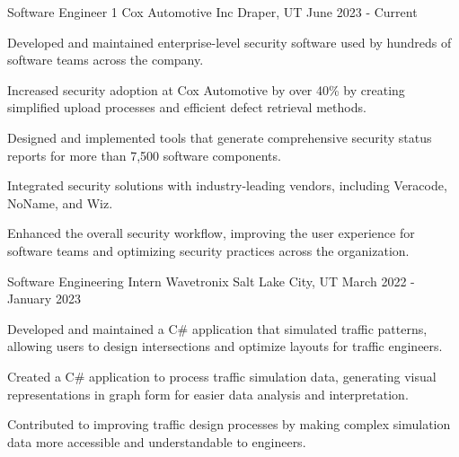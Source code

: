 


\begin{cventries}


\cventry
{Software Engineer 1} %
{Cox Automotive Inc} %
{Draper, UT} %
{June 2023 - Current} %
{ %
\begin{cvitems}
\item {Developed and maintained enterprise-level security software used by hundreds of software teams across the company.}
\item {Increased security adoption at Cox Automotive by over 40\% by creating simplified upload processes and efficient defect retrieval methods.}
\item {Designed and implemented tools that generate comprehensive security status reports for more than 7,500 software components.}
\item {Integrated security solutions with industry-leading vendors, including Veracode, NoName, and Wiz.}
\item {Enhanced the overall security workflow, improving the user experience for software teams and optimizing security practices across the organization.}
\end{cvitems}
}


\cventry
{Software Engineering Intern} %
{Wavetronix} %
{Salt Lake City, UT} %
{March 2022 - January 2023} %
{ %
\begin{cvitems}
\item {Developed and maintained a C\# application that simulated traffic patterns, allowing users to design intersections and optimize layouts for traffic engineers.}
\item {Created a C\# application to process traffic simulation data, generating visual representations in graph form for easier data analysis and interpretation.}
\item {Contributed to improving traffic design processes by making complex simulation data more accessible and understandable to engineers.}
\end{cvitems}
}


\end{cventries}